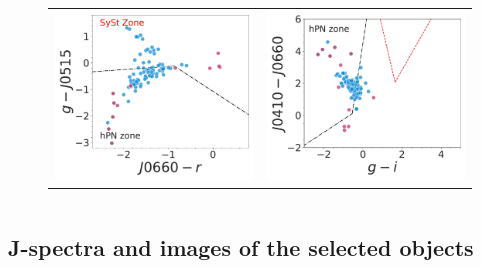 \documentclass[11pt]{article}
\newcommand\raiselabel[1]{\raisebox{0.9\figwidth}[-0.5\figwidth]{#1}}
\begin{document}
\begin{figure}
\begin{tabular}{l l}
\includegraphics[width=0.5\linewidth, trim=10 10 10 10, clip]{figs-pca-v1/Fig4-PN-pc-Halpha_emitters_threeerror-cleaning-limfilter-limcolor-flags-mask-broad-g.pdf} & \includegraphics[width=0.5\linewidth, trim=10 10 10 10, clip]{figs-pca-v1/Fig5-PN-pc-Halpha_emitters_threeerror-cleaning-limfilter-limcolor-flags-mask-broad-gi-v2.pdf} \\
\end{tabular}
\caption{}
\label{fig:smppne}
\end{figure}


\clearpage
\begin{longtable}{ccc}
  
\end{longtable}

\clearpage
\subsection{J-spectra and images of the selected objects}
\label{sec:smote}
\begin{longtable}{ccc}

\end{longtable} 
\end{document}
